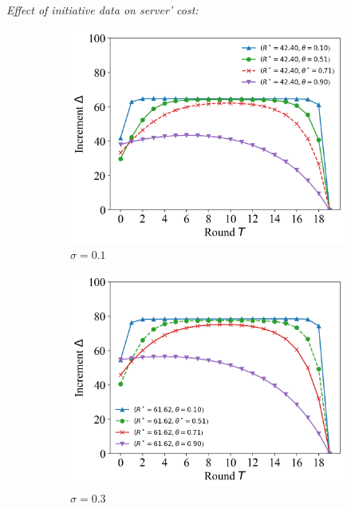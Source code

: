 \documentclass{article}
\theoremstyle{plain}
\theoremstyle{definition}
\theoremstyle{remark}
\begin{document}
\textit{Effect of initiative data on server' cost:}
\begin{figure}
	\begin{subfigure}{0.31\textwidth}
		\centering
    \includegraphics[width=\textwidth]{figures/figure_62_A.png}
    \caption{$\sigma=0.1$}
	\end{subfigure}
  \quad
	\begin{subfigure}{0.31\textwidth}
		\centering
		\includegraphics[width=\textwidth]{figures/figure_62_B.png}
    \caption{$\sigma=0.3$}
	\end{subfigure}
  \quad
  \begin{subfigure}{0.31\textwidth}
		\centering

\end{subfigure}
\end{figure}
\end{document}
